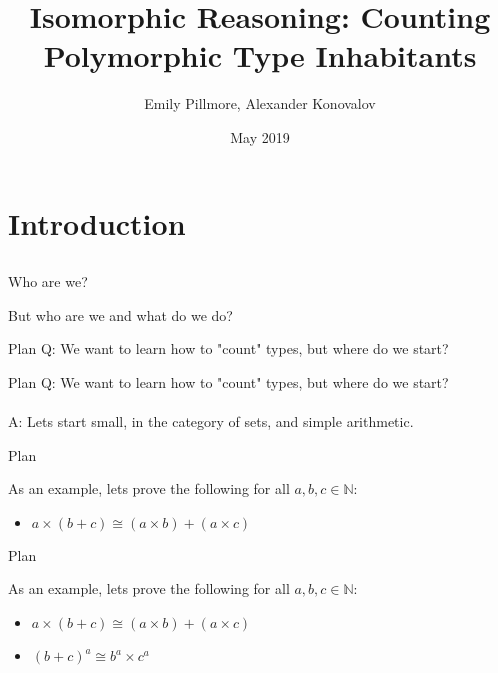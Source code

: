 \documentclass[tikz]{beamer}
\title{Isomorphic Reasoning: Counting Polymorphic Type Inhabitants}
\author{Emily Pillmore, Alexander Konovalov}
\date{May 2019}
\theoremstyle{definition}
\begin{document}
\maketitle

\section{Introduction}
\subsection{}

\begin{frame}{Who are we?}

But who are we and what do we do?

\end{frame}

\begin{frame}{Plan}
    Q: We want to learn how to "count" types, but where do we start? 
\end{frame}{}

\begin{frame}{Plan}
    Q: We want to learn how to "count" types, but where do we start? 
    \\
    \\
    A: Lets start small, in the category of sets, and simple arithmetic.
\end{frame}{}

\begin{frame}{Plan}

As an example, lets prove the following for all $a, b, c \in \mathbb{N}$:

\begin{itemize}
    \item $a \times (b + c) \cong (a \times b) + (a \times c)$
\end{itemize}

\end{frame}

\begin{frame}{Plan}

As an example, lets prove the following for all $a, b, c \in \mathbb{N}$:

\begin{itemize}
    \item $a \times (b + c) \cong (a \times b) + (a \times c)$
    \item $(b + c)^a \cong b^a \times c^a$
\end{itemize}

\end{frame}
\end{document}
